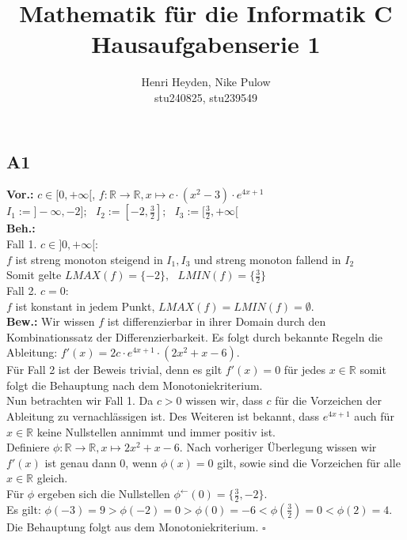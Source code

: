 \documentclass[12pt, a4paper]{article}
\title{Mathematik für die Informatik C\\Hausaufgabenserie 1}
\author{Henri Heyden, Nike Pulow \\ \small stu240825, stu239549}
\date{}
\newcommand*{\qed}{\null\nobreak\hfill\ensuremath{\square}}
\newcommand*{\gap}{\text{ }}
\newcommand*{\vor}{\textbf{Vor.:} \gap}
\newcommand*{\beh}{\textbf{Beh.:} \gap}
\newcommand*{\bew}{\textbf{Bew.:} \gap}
\begin{document}
\maketitle

\doublespacing
\subsection*{A1}
    \vor
        \(c \in [0, +\infty[\), \gap \(f : \mathbb R \rightarrow \mathbb R, x \mapsto c\cdot (x^2-3)\cdot e^{4x+1}\) \\
        \(I_1 := ]-\infty, -2]; \gap I_2 := [-2, \frac{3}{2}]; \gap I_3 := [\frac{3}{2}, +\infty[\) \\
    \beh \\
        Fall 1. \(c \in ]0, +\infty[\): \\ \(f\) ist streng monoton steigend in \(I_1, I_3\) und streng monoton fallend in \(I_2\) \\
        Somit gelte \(LMAX(f) = \{-2\}, \gap LMIN(f) = \{\frac{3}{2}\}\) \\
        Fall 2. \(c = 0\): \\ \(f\) ist konstant in jedem Punkt, \(LMAX(f) = LMIN(f) = \emptyset\). \\
    \bew Wir wissen \(f\) ist differenzierbar in ihrer Domain durch den Kombinationssatz der Differenzierbarkeit. Es folgt durch bekannte Regeln die Ableitung: \(f'(x) = 2c \cdot e^{4x+1} \cdot (2x^2+x-6)\).\\
    Für Fall 2 ist der Beweis trivial, denn es gilt \(f'(x) = 0\) für jedes \(x \in \mathbb R\) somit folgt die Behauptung nach dem Monotoniekriterium. \\
    Nun betrachten wir Fall 1. Da \(c > 0\) wissen wir, dass \(c\) für die Vorzeichen der Ableitung zu vernachlässigen ist. Des Weiteren ist bekannt, dass \(e^{4x+1}\) auch für \(x \in \mathbb R\) keine Nullstellen annimmt und immer positiv ist. \\
    Definiere \(\phi : \mathbb R \rightarrow \mathbb R, x \mapsto 2x^2+x-6\). Nach vorheriger Überlegung wissen wir \(f'(x)\) ist genau dann \(0\), wenn \(\phi(x) = 0\) gilt, sowie sind die Vorzeichen für alle \(x\in \mathbb R\) gleich. \\
    Für \(\phi\) ergeben sich die Nullstellen \(\phi^{\leftarrow}(0) = \{\frac{3}{2}, -2\}\). \\
    Es gilt: \(\phi(-3) = 9 > \phi(-2) = 0 > \phi(0) = -6 < \phi(\frac{3}{2}) = 0 < \phi(2) = 4\).\\ 
    Die Behauptung folgt aus dem Monotoniekriterium. \qed
\end{document}
